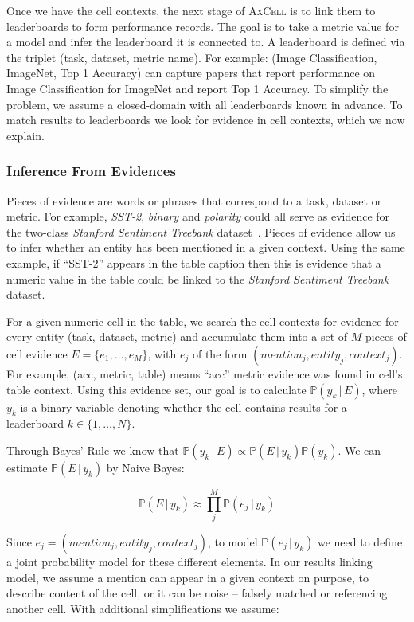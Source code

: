 \documentclass[11pt,a4paper]{article}
\newcommand{\PrOP}{\mathbb{P}}
\newcommand{\pr}[1]{\PrOP\left(#1\right)}
\newcommand{\model}{\textsc{AxCell}}
\newcommand{\prCond}[2]{\PrOP\left(#1\,|\,#2\right)}
\begin{document}
Once we have the cell contexts, the next stage of \model{} is to link them to leaderboards to form performance records. The goal is to take a metric value for a model and infer the leaderboard it is connected to. A leaderboard is defined via the triplet (task, dataset, metric name). For example: (Image Classification, ImageNet, Top 1 Accuracy) can capture papers that report performance on Image Classification for ImageNet and report Top 1 Accuracy. To simplify the problem, we assume a closed-domain with all leaderboards known in advance.
To match results to leaderboards we look for evidence in cell contexts, which we now explain.

\subsubsection{Inference From Evidences}
\label{sec:linking-inference}

Pieces of evidence are words or phrases that correspond to a task, dataset or metric. For example, \textit{SST-2}, \textit{binary} and \textit{polarity} could all serve as evidence for the two-class \textit{Stanford Sentiment Treebank} dataset~\citep{sst-2}. Pieces of evidence allow us to infer whether an entity has been mentioned in a given context. Using the same example, if ``SST-2'' appears in the table caption then this is evidence that a numeric value in the table could be linked to the \textit{Stanford Sentiment Treebank} dataset.

For a given numeric cell in the table, we search the cell contexts for evidence for every entity (task, dataset, metric) and accumulate them into a set of $M$ pieces of cell evidence $E = \{e_{1}, \ldots, e_{M}\}$, with $e_{j}$ of the form $(\textit{mention}_j, \textit{entity}_j, \textit{context}_j)$. For example, (acc, metric, table) means ``acc'' metric evidence was found in cell's table context. Using this evidence set, our goal is to calculate $\prCond{y_{k}}{E}$,  where $y_{k}$ is a binary variable denoting whether the cell contains results for a leaderboard $k \in \{1, \dots, N\}$.

Through Bayes' Rule we know that $\prCond{y_{k}}{E} \propto \prCond{E}{y_{k}}\pr{y_{k}}$. We can estimate $\prCond{E}{y_{k}}$ by Naive Bayes:

$$ \prCond{E}{y_{k}} \approx \prod_{j}^{M}\prCond{e_{j}}{y_{k}} $$

Since $e_j=(\textit{mention}_j, \textit{entity}_j, \textit{context}_j)$, to model $\prCond{e_{j}}{y_{k}}$ we need to define a joint probability model for these different elements. In our results linking model, we assume a mention can appear in a given context on purpose, to describe content of the cell, or it can be noise -- falsely matched or referencing another cell. With additional simplifications we assume:
\end{document}
